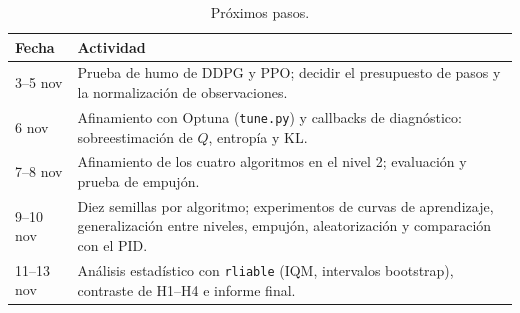 \documentclass[11pt,a4paper]{article}
\newcommand{\code}[1]{\texttt{#1}}
\begin{document}
\begin{table}[H]
\centering
\caption{Próximos pasos.}
\begin{tabularx}{\textwidth}{@{}lX@{}}
\toprule
Fecha & Actividad \\
\midrule
3--5 nov & Prueba de humo de DDPG y PPO; decidir el presupuesto de pasos y la normalización de observaciones. \\
6 nov & Afinamiento con Optuna (\code{tune.py}) y callbacks de diagnóstico: sobreestimación de $Q$, entropía y KL. \\
7--8 nov & Afinamiento de los cuatro algoritmos en el nivel 2; evaluación y prueba de empujón. \\
9--10 nov & Diez semillas por algoritmo; experimentos de curvas de aprendizaje, generalización entre niveles, empujón, aleatorización y comparación con el PID. \\
11--13 nov & Análisis estadístico con \code{rliable} (IQM, intervalos bootstrap), contraste de H1--H4 e informe final. \\
\bottomrule
\end{tabularx}
\end{table}
\end{document}
